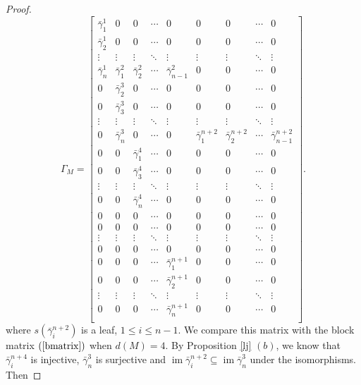 \documentclass[a4paper,12pt]{amsart}
\newcommand{\bg}{\bar{\gamma}}
\DeclareMathOperator{\im}{im}
\begin{document}
\begin{proof}
\begin{equation}\label{five}
\Gamma_M=\begin{bmatrix}
\bg^1_1 & 0  & 0 & \cdots & 0  & 0 & 0& \cdots & 0\\
\bg^1_2 & 0 & 0& \cdots & 0 & 0 & 0& \cdots & 0\\
\vdots &   \vdots & \vdots & \ddots  & \vdots  & \vdots & \vdots& \ddots & \vdots\\
\bg^1_n & \bg^2_1 & \bg^2_2& \cdots & \bg^2_{n-1} & 0 & 0& \cdots & 0\\
0 & \bg^3_2 & 0 & \cdots & 0  & 0 & 0& \cdots & 0\\
0 & \bg^3_3 & 0 & \cdots & 0  & 0 & 0& \cdots & 0\\
\vdots &   \vdots & \vdots & \ddots  & \vdots   & \vdots & \vdots& \ddots & \vdots\\
0 & \bg^3_n & 0 & \cdots & 0& \bg^{n+2}_1 & \bg^{n+2}_2 & \cdots & \bg^{n+2}_{n-1} \\
0 & 0 & \bg^4_1 & \cdots & 0  & 0 & 0& \cdots & 0\\
0 & 0 & \bg^4_3 & \cdots & 0  & 0 & 0& \cdots & 0\\
\vdots &   \vdots & \vdots & \ddots  & \vdots   & \vdots & \vdots& \ddots & \vdots\\
0 & 0 & \bg^4_n & \cdots & 0  & 0 & 0& \cdots & 0\\
0 & 0 & 0 & \cdots & 0  & 0 & 0& \cdots  & 0\\
0 & 0 & 0 & \cdots & 0  & 0 & 0& \cdots  & 0\\
\vdots &   \vdots & \vdots & \ddots  & \vdots  & \vdots & \vdots&\ddots & \vdots \\
0 & 0 & 0 & \cdots & 0  & 0 & 0& \cdots  & 0\\
0 & 0 & 0 & \cdots & \bg^{n+1}_1  & 0 & 0& \cdots  & 0\\
0 & 0 & 0 & \cdots & \bg^{n+1}_2  & 0 & 0& \cdots  & 0\\
\vdots &   \vdots & \vdots & \ddots  & \vdots   & \vdots & \vdots& \ddots & \vdots\\
0 & 0 & 0 & \cdots & \bg^{n+1}_n  & 0 & 0& \cdots & 0\\
\end{bmatrix}.
\end{equation}
where $s(\bg^{n+2}_i)$ is a leaf, $1\leq i\leq n-1$. We compare this matrix with the block matrix  $(\ref{bmatrix})$ when $d(M)=4$. By Proposition \ref{lj} $(b)$, we know that $\bg^{n+4}_i$ is injective, $\bg^3_n$ is surjective and $\im \bg^{n+2}_i\subseteq \im \bg^3_n$ under the isomorphisms.  Then 


\end{proof}
\end{document}
